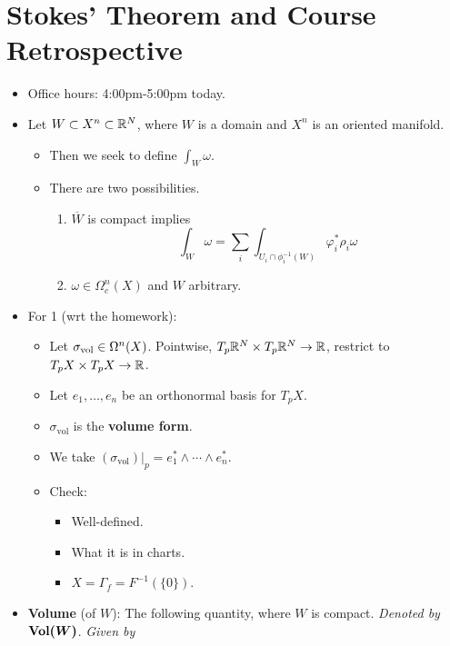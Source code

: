 \documentclass[../notes.tex]{subfiles}
\begin{document}
\section{Stokes' Theorem and Course Retrospective}
\begin{itemize}
    \item {}Office hours: 4:00pm-5:00pm today.
    \item Let $W\subset X^n\subset\R^N$, where $W$ is a domain and $X^n$ is an oriented manifold.
    \begin{itemize}
        \item Then we seek to define $\int_W\omega$.
        \item There are two possibilities.
        \begin{enumerate}
            \item $\overline{W}$ is compact implies
            \begin{equation*}
                \int_W\omega = \sum_i\int_{U_i\cap\phi_i^{-1}(W)}\varphi_i^*\rho_i\omega
            \end{equation*}
            \item $\omega\in\Omega_c^n(X)$ and $W$ arbitrary.
        \end{enumerate}
    \end{itemize}
    \item For 1 (wrt the homework):
    \begin{itemize}
        \item Let $\sigma_\text{vol}\in\ome[n]{X}$. Pointwise, $T_p\R^N\times T_p\R^N\to\R$, restrict to $T_pX\times T_pX\to\R$.
        \item Let $e_1,\dots,e_n$ be an orthonormal basis for $T_pX$.
        \item $\sigma_\text{vol}$ is the \textbf{volume form}.
        \item We take $(\sigma_\text{vol})|_p=e_1^*\wedge\cdots\wedge e_n^*$.
        \item Check:
        \begin{itemize}
            \item Well-defined.
            \item What it is in charts.
            \item $X=\Gamma_f=F^{-1}(\{0\})$.
        \end{itemize}
    \end{itemize}
    \item \textbf{Volume} (of $W$): The following quantity, where $W$ is compact. \emph{Denoted by} $\bm{\Vol(W)}$. \emph{Given by}

\end{itemize}
\end{document}
